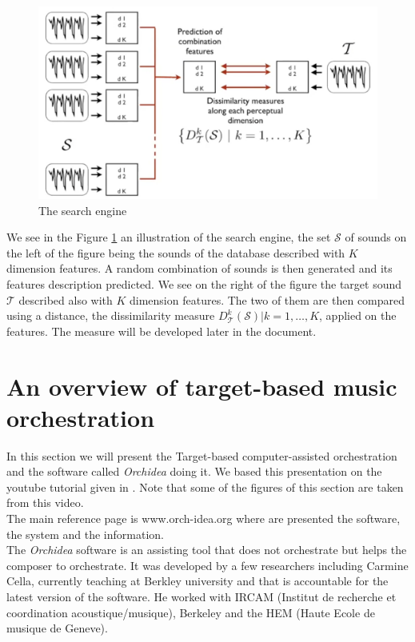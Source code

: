 \documentclass[a4paper]{book}
\begin{document}
\begin{figure}[h!]
\centering
\includegraphics[scale=0.4]{searchengine.png}
\caption{The search engine}
\label{fig:searchengine}
\end{figure}

We see in the Figure \ref{fig:searchengine} an illustration of the search engine, the set $\mathcal{S}$ of sounds on the left of the figure being the sounds of the database described with $K$ dimension features. A random combination of sounds is then generated and its features description predicted. We see on the right of the figure the target sound $\mathcal{T}$ described also with $K$ dimension features. The two of them are then compared using a distance, the dissimilarity measure $D^k_\mathcal{T}(\mathcal{S}) | k=1,\ldots,K$, applied on the features. The measure will be developed later in the document.\\


\section{An overview of target-based music orchestration}\label{otargorch}

In this section we will present the Target-based computer-assisted orchestration and the software called \textit{Orchidea} doing it. We based this presentation on the youtube tutorial given in \cite{youtubecella}. Note that some of the figures of this section are taken from this video.\\


The main reference page is www.orch-idea.org where are presented the software, the system and the information.\\
The \textit{Orchidea} software is an assisting tool that does not orchestrate but helps the composer to orchestrate. It was developed by a few researchers including Carmine Cella, currently teaching at Berkley university and that is accountable for the latest version of the software. He worked with IRCAM (Institut de recherche et coordination acoustique/musique), Berkeley and the HEM (Haute Ecole de musique de Geneve). \\
\end{document}
